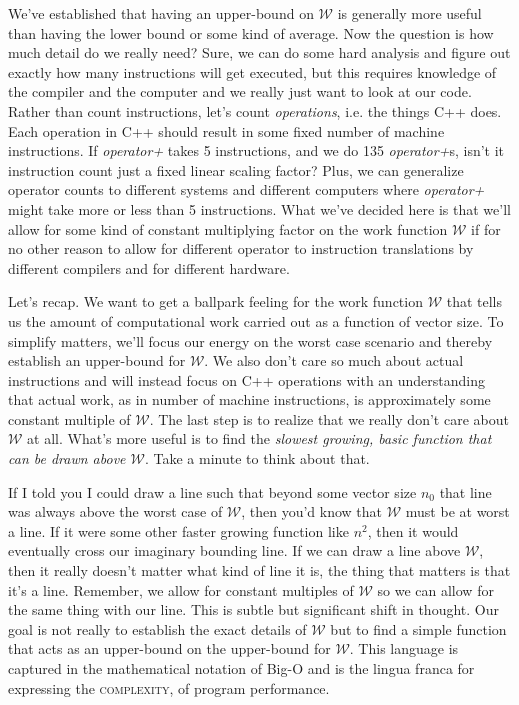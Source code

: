 \documentclass[]{tufte-handout}
\begin{document}
We've established that having an upper-bound on $\mathcal{W}$ is generally more useful than having the lower bound or some kind of average.  Now the question is how much detail do we really need? Sure, we can do some hard analysis and figure out exactly how many instructions will get executed, but this requires knowledge of the compiler and the computer and we really just want to look at our code. Rather than count instructions, let's count \textit{operations}, i.e. the things C++ does. Each operation in C++ should result in some fixed number of machine instructions. If \textit{operator+} takes 5 instructions, and we do 135 \textit{operator+}s, isn't it instruction count just a fixed linear scaling factor? Plus, we can generalize operator counts to different systems and different computers where \textit{operator+} might take more or less than 5 instructions. What we've decided here is that we'll allow for some kind of constant multiplying factor on the work function $\mathcal{W}$ if for no other reason to allow for different operator to instruction translations by different compilers and for different hardware.

Let's recap. We want to get a ballpark feeling for the work function $\mathcal{W}$ that tells us the amount of computational work carried out as a function of vector size. To simplify matters, we'll focus our energy on the worst case scenario and thereby establish an upper-bound for $\mathcal{W}$. We also don't care so much about actual instructions and will instead focus on C++ operations with an understanding that actual work, as in number of machine instructions, is approximately some constant multiple of $\mathcal{W}$. The last step is to realize that we really don't care about $\mathcal{W}$ at all. What's more useful is to find the \textit{slowest growing, basic function that can be drawn above $\mathcal{W}$}. Take a minute to think about that.

If I told you I could draw a line such that beyond some vector size $n_0$ that line was always above the worst case of $\mathcal{W}$, then you'd know that $\mathcal{W}$ must be at worst a line. If it were some other faster growing function like $n^2$, then it would eventually cross our imaginary bounding line. If we can draw a line above $\mathcal{W}$, then it really doesn't matter what kind of line it is, the thing that matters is that it's a line. Remember, we allow for constant multiples of $\mathcal{W}$ so we can allow for the same thing with our line.  This is subtle but significant shift in thought. Our goal is not really to establish the exact details of $\mathcal{W}$ but to find a simple function that acts as an upper-bound on the upper-bound for $\mathcal{W}$.  This language is captured in the mathematical notation of Big-O and is the lingua franca for expressing the \textsc{complexity}, of program performance.  
\end{document}
